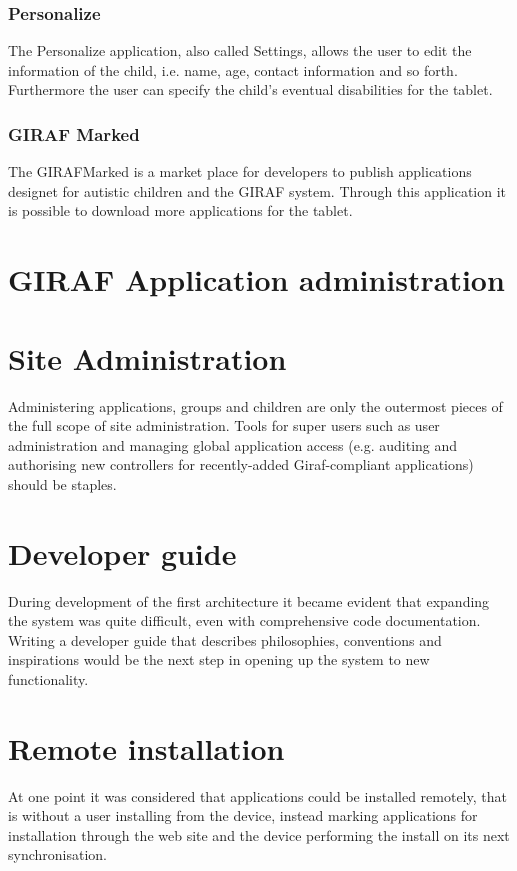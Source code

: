 \subsubsection*{Personalize}
The Personalize application, also called Settings, allows the user to edit the information of the child, i.e. name, age, contact information and so forth. Furthermore the user can specify the child's eventual disabilities for the tablet.

\subsubsection*{GIRAF Marked}
The GIRAFMarked is a market place for developers to publish applications designet for autistic children and the GIRAF system. Through this application it is possible to download more applications for the tablet. 







\section{GIRAF Application administration}



\section{Site Administration}
Administering applications, groups and children are only the outermost pieces of the full scope of site administration. Tools for super users such as user administration and managing global application access (e.g. auditing and authorising new controllers for recently-added Giraf-compliant applications) should be staples.

\section{Developer guide}
During development of the first architecture it became evident that expanding the system was quite difficult, even with comprehensive code documentation. Writing a developer guide that describes philosophies, conventions and inspirations would be the next step in opening up the system to new functionality.

\section{Remote installation}
At one point it was considered that applications could be installed remotely, that is without a user installing from the device, instead marking applications for installation through the web site and the device performing the install on its next synchronisation.